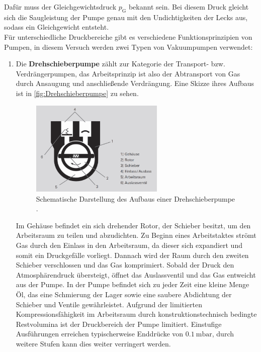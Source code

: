 Dafür muss der Gleichgewichtsdruck $p_{\text{G}}$ bekannt sein. Bei diesem Druck gleicht sich die Saugleistung der Pumpe genau mit den
Undichtigkeiten der Lecks aus, sodass ein Gleichgewicht entsteht. \\
Für unterschiedliche Druckbereiche gibt es verschiedene Funktionsprinzipien von Pumpen, in diesem Versuch werden zwei Typen von Vakuumpumpen verwendet:
\begin{enumerate}
    \item Die \textbf{Drehschieberpumpe} zählt zur Kategorie der Transport- bzw. Verdrängerpumpen, das Arbeitsprinzip ist also der Abtransport von Gas
    durch Ansaugung und anschließende Verdrängung. Eine Skizze ihres Aufbaus ist in \autoref{fig:Drehschieberpumpe} zu sehen.
    \begin{figure}[H]
        \centering
        \includegraphics[width=0.6\textwidth]{content/pics/drehschieberpumpe.png}
        \caption{Schematische Darstellung des Aufbaus einer Drehschieberpumpe \cite{Pfeiffer_Drehschieberpumpe}.}
        \label{fig:Drehschieberpumpe}
    \end{figure}
    Im Gehäuse befindet ein sich drehender Rotor, der Schieber besitzt, um den Arbeitsraum zu teilen und abzudichten.
    Zu Beginn eines Arbeitstaktes strömt Gas durch den Einlass in den Arbeitsraum, da dieser sich expandiert und somit ein Druckgefälle vorliegt.
    Dannach wird der Raum durch den zweiten Schieber verschlossen und das Gas komprimiert. Sobald der Druck den Atmosphärendruck übersteigt,
    öffnet das Auslassventil und das Gas entweicht aus der Pumpe. In der Pumpe befindet sich zu jeder Zeit eine kleine Menge Öl, das
    eine Schmierung der Lager sowie eine saubere Abdichtung der Schieber und Ventile gewährleistet. Aufgrund der limitierten Kompressionsfähigkeit
    im Arbeitsraum durch konstruktionstechnisch bedingte Restvolumina ist der Druckbereich der Pumpe limitiert.
    Einstufige Ausführungen erreichen typischerweise Enddrücke von $\qty{0.1}{\milli\bar}$, durch weitere Stufen kann dies weiter verringert werden.

\end{enumerate}
